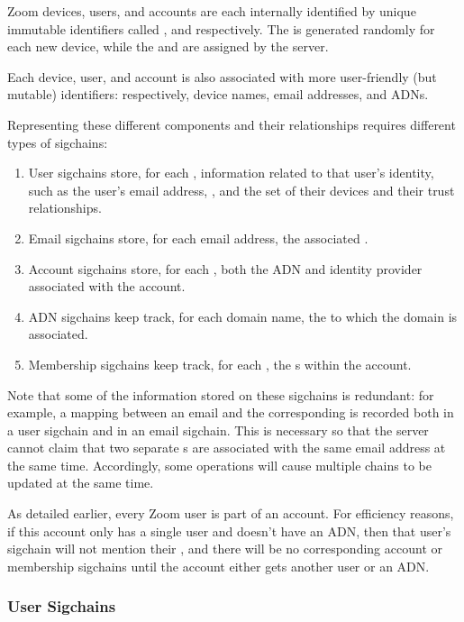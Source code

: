 Zoom devices, users, and accounts are each internally identified by unique immutable identifiers
called \deviceid, \userID and \accountID respectively. The \deviceid is generated randomly for each
new device, while the \userID and \accountID are assigned by the server.

Each device, user, and account is also associated with more user-friendly (but mutable) identifiers: respectively,
device names, email addresses, and ADNs.

Representing these different components and their relationships requires different types of
sigchains:

\begin{enumerate}
\item User sigchains store, for each \userID, information related to that user’s identity, such as
    the user’s email address, \accountID, and the set of their devices and their trust
    relationships.
\item Email sigchains store, for each email address, the associated \userID.
\item Account sigchains store, for each \accountID, both the ADN and identity provider associated with
    the account.
\item ADN sigchains keep track, for each domain name, the \accountID to which the domain is
    associated.
\item Membership sigchains keep track, for each \accountID, the {\userID}s within the account.
\end{enumerate}

Note that some of the information stored on these sigchains is redundant: for example, a mapping
between an email and the corresponding \userID is recorded both in a user sigchain and in an email
sigchain. This is necessary so that the server cannot claim that two separate {\userID}s are
associated with the same email address at the same time. Accordingly, some operations will cause
multiple chains to be updated at the same time.

As detailed earlier, every Zoom user is part of an account. For efficiency reasons, if this account
only has a single user and doesn't have an ADN, then that user's sigchain will not mention their
\accountID, and there will be no corresponding account or membership sigchains until the
account either gets another user or an ADN.

\subsubsection{User Sigchains}

